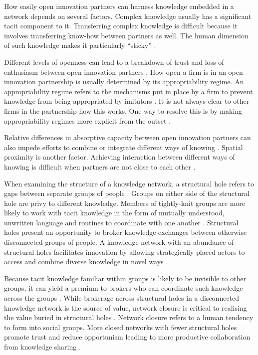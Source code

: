 How easily open innovation partners can harness knowledge embedded in a network depends on several factors. Complex knowledge usually has a significant tacit component to it. Transferring complex knowledge is difficult because it involves transferring know-how between partners as well. The human dimension of such knowledge makes it particularly \enquote{sticky} \citep{von1994sticky,szulanski2003sticky}. \medskip

Different levels of openness can lead to a breakdown of trust and loss of enthusiasm between open innovation partners \citep{laursen2014paradox,dragsdahl2019perspective}. How open a firm is in an open innovation partnership is usually determined by its appropriability regime. An appropriability regime refers to the mechanisms put in place by a firm to prevent knowledge from being appropriated by imitators \citep{teece1998capturing,hurmelinna2008appropriability}. It is not always clear to other firms in the partnership how this works. One way to resolve this is by making appropriability regimes more explicit from the outset \citep{gama2019managing}. \medskip

Relative differences in absorptive capacity between open innovation partners can also impede efforts to combine or integrate different ways of knowing \citep{vanhaverbeke2007connecting,lichtenthaler2016absorptive}. Spatial proximity is another factor. Achieving interaction between different ways of knowing is difficult when partners are not close to each other \citep{wineman2009spatial,roper2018knowledge}. \medskip

When examining the structure of a knowledge network, a structural hole refers to gaps between separate groups of people \citep{burt2000network}. Groups on either side of the structural hole are privy to different knowledge. Members of tightly-knit groups are more likely to work with tacit knowledge in the form of mutually understood, unwritten language and routines to coordinate with one another \citep{burt2007secondhand}. Structural holes present an opportunity to broker knowledge exchanges between otherwise disconnected groups of people. A knowledge network with an abundance of structural holes facilitates innovation by allowing strategically placed actors to access and combine diverse knowledge in novel ways \citep{burt2004structural,sparrowe2011publishing}. \medskip

Because tacit knowledge familiar within groups is likely to be invisible to other groups, it can yield a premium to brokers who can coordinate such knowledge across the groups \citep{burt2007secondhand}. While brokerage across structural holes in a disconnected knowledge network is the source of value, network closure is critical to realising the value buried in structural holes \citep{burt2004structural,rost2011strength}. Network closure refers to a human tendency to form into social groups. More closed networks with fewer structural holes promote trust and reduce opportunism leading to more productive collaboration from knowledge sharing \citep{ahuja2000collaboration}. \medskip

